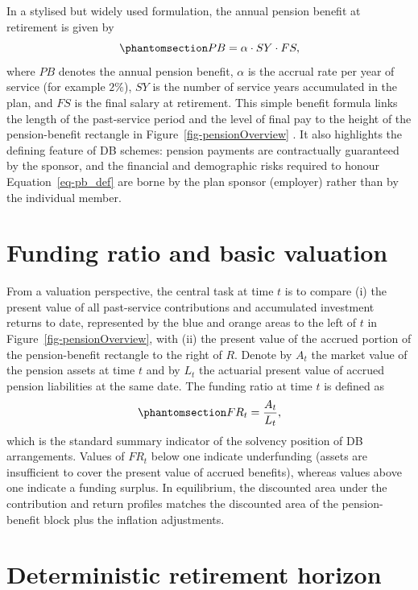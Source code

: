 \documentclass[
  letterpaper,
  DIV=11,
  numbers=noendperiod]{scrreprt}
\begin{document}
In a stylised but widely used formulation, the annual pension benefit at
retirement is given by
\begin{equation}\protect\phantomsection\label{eq-pb_def}{
    PB = \alpha \cdot SY \cdot FS,
}\end{equation} where \(PB\) denotes the annual pension benefit,
\(\alpha\) is the accrual rate per year of service (for example
\(2\%\)), \(SY\) is the number of service years accumulated in the plan,
and \(FS\) is the final salary at retirement. This simple benefit
formula links the length of the past-service period and the level of
final pay to the height of the pension-benefit rectangle in
Figure~\ref{fig-pensionOverview} . It also highlights the defining
feature of DB schemes: pension payments are contractually guaranteed by
the sponsor, and the financial and demographic risks required to honour
Equation~\ref{eq-pb_def} are borne by the plan sponsor (employer) rather
than by the individual member.

\section{Funding ratio and basic
valuation}\label{funding-ratio-and-basic-valuation}

From a valuation perspective, the central task at time \(t\) is to
compare (i) the present value of all past-service contributions and
accumulated investment returns to date, represented by the blue and
orange areas to the left of \(t\) in Figure~\ref{fig-pensionOverview},
with (ii) the present value of the accrued portion of the
pension-benefit rectangle to the right of \(R\). Denote by \(A_t\) the
market value of the pension assets at time \(t\) and by \(L_t\) the
actuarial present value of accrued pension liabilities at the same date.
The funding ratio at time \(t\) is defined as
\begin{equation}\protect\phantomsection\label{eq-FR_def}{
    FR_t = \frac{A_t}{L_t},
}\end{equation} which is the standard summary indicator of the solvency
position of DB arrangements. Values of \(FR_t\) below one indicate
underfunding (assets are insufficient to cover the present value of
accrued benefits), whereas values above one indicate a funding surplus.
In equilibrium, the discounted area under the contribution and return
profiles matches the discounted area of the pension-benefit block plus
the inflation adjustments.

\section{Deterministic retirement
horizon}\label{deterministic-retirement-horizon}
\end{document}
